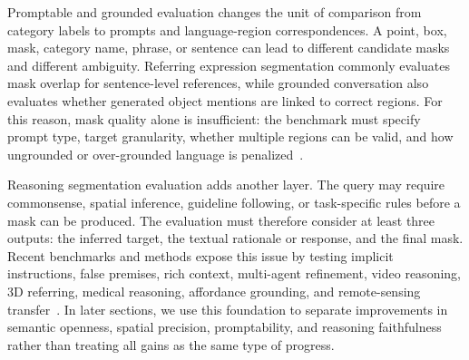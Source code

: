 Promptable and grounded evaluation changes the unit of comparison from category labels to prompts and language-region correspondences. A point, box, mask, category name, phrase, or sentence can lead to different candidate masks and different ambiguity. Referring expression segmentation commonly evaluates mask overlap for sentence-level references, while grounded conversation also evaluates whether generated object mentions are linked to correct regions. For this reason, mask quality alone is insufficient: the benchmark must specify prompt type, target granularity, whether multiple regions can be valid, and how ungrounded or over-grounded language is penalized~\citep{youFerretReferGround2024,rasheedGlammPixelGrounding2024,huGroundingSuiteMeasuringComplex2025}.

Reasoning segmentation evaluation adds another layer. The query may require commonsense, spatial inference, guideline following, or task-specific rules before a mask can be produced. The evaluation must therefore consider at least three outputs: the inferred target, the textual rationale or response, and the final mask. Recent benchmarks and methods expose this issue by testing implicit instructions, false premises, rich context, multi-agent refinement, video reasoning, 3D referring, medical reasoning, affordance grounding, and remote-sensing transfer~\citep{guoSeeingBelievingRichContext2026,vvatsGuidelineConsistentSegmentationMultiAgent2026,xuVideosegr1ReasoningVideo2026,chen3DDRESDetailed3D2026,yanMedreasonerReinforcementLearning2026,wangAffordancer1ReinforcementLearning2026}. In later sections, we use this foundation to separate improvements in semantic openness, spatial precision, promptability, and reasoning faithfulness rather than treating all gains as the same type of progress.
